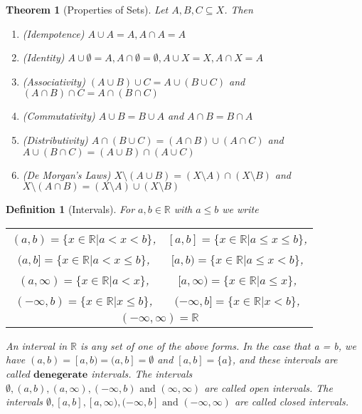\documentclass[11pt, oneside]{book}
\theoremstyle{break}
\newtheorem{thm}{Theorem}[section]
\newtheorem{defn}{Definition}[section]
\newcommand{\bb}[1]{\mathbb{#1}}		%
\begin{document}
\begin{thm}[Properties of Sets]
	Let $A, B, C \subseteq X$. Then
	\begin{enumerate}
		\item (Idempotence) $A \cup A = A, A \cap A = A$
		\item (Identity) $A \cup \emptyset = A, A \cap \emptyset = \emptyset, A \cup X = X, A \cap X = A$
		\item (Associativity) $(A \cup B) \cup C = A \cup (B \cup C)$ and $(A \cap B) \cap C = A \cap (B \cap C)$
		\item (Commutativity) $A \cup B = B \cup A$ and $A \cap B = B \cap A$
		\item (Distributivity) $A \cap (B \cup C) = (A \cap B) \cup (A \cap C)$ and $A \cup (B \cap C) = (A \cup B) \cap (A \cup C)$
		\item (De Morgan's Laws) $X \setminus (A \cup B) = (X \setminus A) \cap (X \setminus B)$ and $X \setminus (A \cap B) = (X \setminus A) \cup (X \setminus B)$
	\end{enumerate}
\end{thm}

\begin{defn}[Intervals]
	For $a, b \in \bb{R}$ with $a \leq b$ we write
	\begin{center}
		\begin{tabular}{c c}
			$(a, b) = \{x \in \bb{R} | a < x < b\}$,	&	$[a, b] = \{x \in \bb{R} | a \leq x \leq b \}$,\\
			$(a, b] = \{x \in \bb{R} | a < x \leq b \}$,	&	$[a, b) = \{x \in \bb{R} | a \leq x < b \}$,\\
			$(a, \infty) = \{x \in \bb{R} | a < x \}$,	&	$[a, \infty) = \{x \in \bb{R} | a \leq x\}$,\\
			$(-\infty, b) = \{x \in \bb{R} | x \leq b\}$,	&	$(-\infty, b] = \{x \in \bb{R} | x < b\}$,\\
			\multicolumn{2}{c}{$(-\infty, \infty) = \bb{R}$}
		\end{tabular}
	\end{center}

	An interval in $\bb{R}$ is any set of one of the above forms. In the case that a = b, we have $(a, b) = [a, b) = (a, b] = \emptyset$ and $[a, b] = \{a\}$, and these intervals are called $\textbf{denegerate}$ intervals. The intervals $\emptyset, (a, b), (a, \infty), (-\infty, b) \text{ and } (\infty, \infty)$ are called open intervals. The intervals $\emptyset, [a, b], [a, \infty), (-\infty, b] \text{ and } (-\infty, \infty)$ are called closed intervals.
\end{defn}
\end{document}
